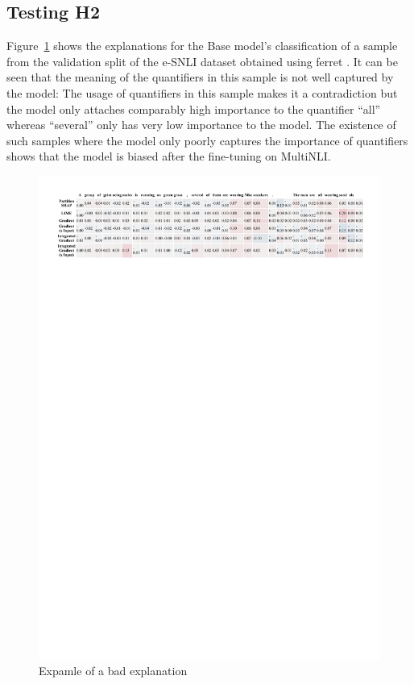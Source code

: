 \subsection{Testing H2}
Figure~\ref{fig:ferret-sample} shows the explanations for the Base model's classification of a sample from the validation split of the \ac{e-SNLI} dataset obtained using ferret \cite{ferret}. It can be seen that the meaning of the quantifiers in this sample is not well captured by the model: The usage of quantifiers in this sample makes it a contradiction but the model only attaches comparably high importance to the quantifier \enquote{all} whereas \enquote{several} only has very low importance to the model. The existence of such samples where the model only poorly captures the importance of quantifiers shows that the model is biased after the fine-tuning on \ac{MultiNLI}.

\begin{figure}[h!]
    \centering
    \includegraphics[width=\textwidth]{./images/ferret_sample.pdf}
    \caption{Expamle of a bad explanation}
    \label{fig:ferret-sample}
\end{figure}

